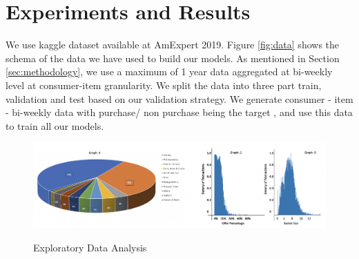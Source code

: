 \section{Experiments and Results}
\label{sec:eval}
We use kaggle dataset available at AmExpert 2019. Figure \ref{fig:data} shows the schema of the data we have used 
to build our models. As mentioned in Section \ref{sec:methodology}, we use a maximum of 1 year data aggregated at bi-weekly 
level at consumer-item granularity. We split the data into three part train, validation and test based 
on our validation strategy. We generate consumer - item - bi-weekly data with purchase/ non purchase 
being the target , and use this data to train all our models.
  \begin{figure}[hbt!]
    \centering 
    \caption{Exploratory Data Analysis} 
    \includegraphics[width=5.5in]{img/sales_dist.png} 
    \label{fig:sales_dist} 
  \end{figure}
